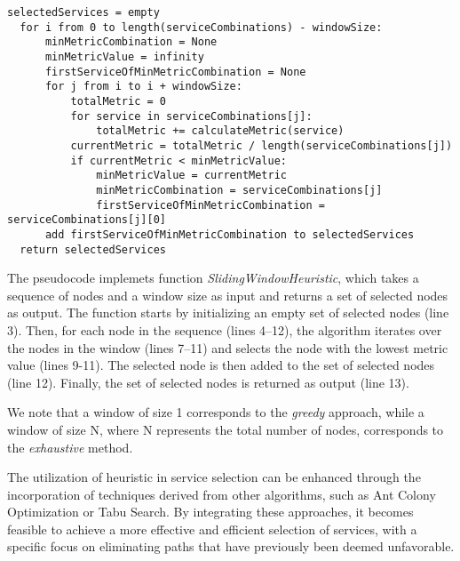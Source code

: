 \begin{lstlisting}[frame=single, caption={Sliding Window Heuristic with Selection of First Service from Optimal Combination},label={lst:slidingwindowfirstservice}]
  selectedServices = empty
  for i from 0 to length(serviceCombinations) - windowSize:
      minMetricCombination = None
      minMetricValue = infinity
      firstServiceOfMinMetricCombination = None
      for j from i to i + windowSize:
          totalMetric = 0
          for service in serviceCombinations[j]:
              totalMetric += calculateMetric(service)
          currentMetric = totalMetric / length(serviceCombinations[j])
          if currentMetric < minMetricValue:
              minMetricValue = currentMetric
              minMetricCombination = serviceCombinations[j]
              firstServiceOfMinMetricCombination = serviceCombinations[j][0]
      add firstServiceOfMinMetricCombination to selectedServices
  return selectedServices

  \end{lstlisting}

The pseudocode implemets function {\em SlidingWindowHeuristic}, which takes a sequence of nodes and a window size as input and returns a set of selected nodes as output. The function starts by initializing an empty set of selected nodes (line 3). Then, for each node in the sequence (lines 4--12), the algorithm iterates over the nodes in the window (lines 7--11) and selects the node with the lowest metric value (lines 9-11). The selected node is then added to the set of selected nodes (line 12). Finally, the set of selected nodes is returned as output (line 13).

We note that a window of size 1 corresponds to the \emph{greedy} approach, while a window of size N, where N represents the total number of nodes, corresponds to the \emph{exhaustive} method.

The utilization of heuristic in service selection can be enhanced through the incorporation of techniques derived from other algorithms, such as Ant Colony Optimization or Tabu Search.
By integrating these approaches, it becomes feasible to achieve a more effective and efficient selection of services, with a specific focus on eliminating paths that have previously been deemed unfavorable.

